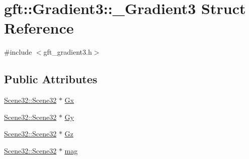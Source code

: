 \hypertarget{structgft_1_1Gradient3_1_1__Gradient3}{\section{gft\-:\-:Gradient3\-:\-:\-\_\-\-Gradient3 Struct Reference}
\label{structgft_1_1Gradient3_1_1__Gradient3}
}


{\ttfamily \#include $<$gft\-\_\-gradient3.\-h$>$}

\subsection*{Public Attributes}
\begin{DoxyCompactItemize}
\item 
\hyperlink{namespacegft_1_1Scene32_ae492ac529c9149889605a7bebd647c46}{Scene32\-::\-Scene32} $\ast$ \hyperlink{structgft_1_1Gradient3_1_1__Gradient3_a0f0004e4f69ca93c57dbdd5ef750b673}{Gx}
\item 
\hyperlink{namespacegft_1_1Scene32_ae492ac529c9149889605a7bebd647c46}{Scene32\-::\-Scene32} $\ast$ \hyperlink{structgft_1_1Gradient3_1_1__Gradient3_ae929510403073f2e3398652e1caeb9ca}{Gy}
\item 
\hyperlink{namespacegft_1_1Scene32_ae492ac529c9149889605a7bebd647c46}{Scene32\-::\-Scene32} $\ast$ \hyperlink{structgft_1_1Gradient3_1_1__Gradient3_a565c66b7cb3f64c121a40149132508f7}{Gz}
\item 
\hyperlink{namespacegft_1_1Scene32_ae492ac529c9149889605a7bebd647c46}{Scene32\-::\-Scene32} $\ast$ \hyperlink{structgft_1_1Gradient3_1_1__Gradient3_adb0a7878ed7937b3112430914f40ed2d}{mag}
\end{DoxyCompactItemize}


